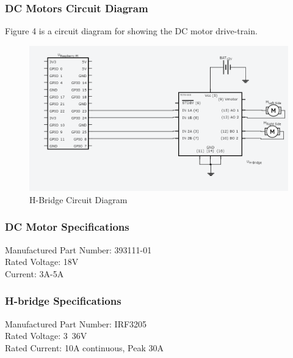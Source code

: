 \documentclass [10pt]{article}
\begin{document}
\subsubsection{DC Motors Circuit Diagram}
Figure 4 is a circuit diagram for showing the DC motor drive-train.
\begin{figure} [h!]
	\centering
	\includegraphics [scale = 0.4] {Figures/H_Bridge.png}
	\caption{H-Bridge Circuit Diagram}
\end{figure}


\subsubsection{DC Motor Specifications}
Manufactured Part Number: 393111-01\\
Rated Voltage: 18V\\
Current: 3A-5A\\


\subsubsection{H-bridge Specifications}
Manufactured Part Number:  IRF3205\\
Rated Voltage: 3~36V \\
Rated Current: 10A continuous, Peak 30A \\

\end{document}
